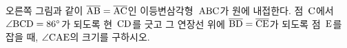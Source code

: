 \noindent\begin{minipage}[t]{0.58\linewidth}\vspace{0pt}\raggedright 오른쪽 그림과 같이 $\overline{\mathrm{AB}}=\overline{\mathrm{AC}}$인 이등변삼각형~$\mathrm{ABC}$가 원에 내접한다. 점~$\mathrm{C}$에서 $\angle\mathrm{BCD}=86^\circ$가 되도록 현~$\mathrm{CD}$를 긋고 그 연장선 위에 $\overline{\mathrm{BD}}=\overline{\mathrm{CE}}$가 되도록 점~$\mathrm{E}$를 잡을 때, $\angle\mathrm{CAE}$의 크기를 구하시오.\end{minipage}\hfill\begin{minipage}[t]{0.4\linewidth}\vspace{0pt}\centering \resizebox{\ifdim\width>\linewidth\linewidth\else\width\fi}{!}{}\end{minipage}\par
